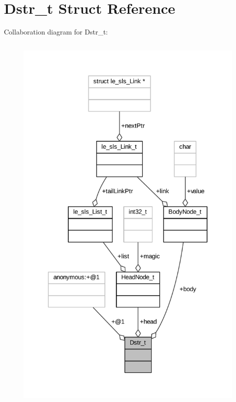 \hypertarget{struct_dstr__t}{}\section{Dstr\+\_\+t Struct Reference}
\label{struct_dstr__t}


Collaboration diagram for Dstr\+\_\+t\+:
\nopagebreak
\begin{figure}[H]
\begin{center}
\leavevmode
\includegraphics[height=550pt]{struct_dstr__t__coll__graph}
\end{center}
\end{figure}
